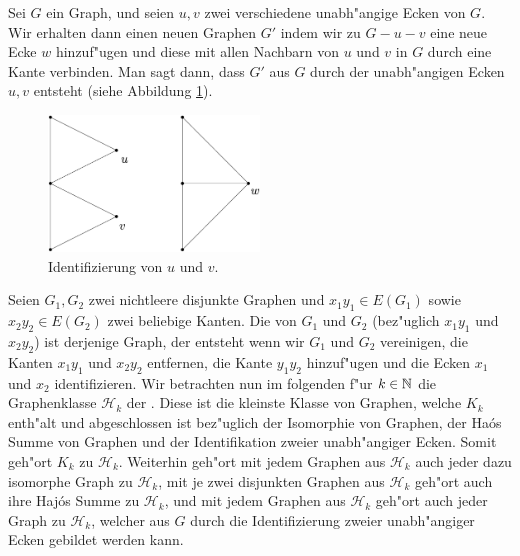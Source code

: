 Sei $G$ ein Graph, und seien $u,v$ zwei verschiedene unabh"angige Ecken von $G$. Wir erhalten dann einen neuen Graphen $G'$ indem wir zu $G-u-v$ eine neue Ecke $w$ hinzuf"ugen und diese mit allen Nachbarn von $u$ und $v$ in $G$ durch eine Kante verbinden.
Man sagt dann, dass $G'$ aus $G$ durch  der unabh"angigen Ecken $u,v$ entsteht (siehe Abbildung \ref{fig:identifizierung}).
\begin{figure}[h]
  \centering
  \includegraphics[width=0.5\textwidth]{images/Identifizierung}
  \caption{Identifizierung von $u$ und $v$.}
  \label{fig:identifizierung}
\end{figure}

Seien $G_1, G_2$ zwei nichtleere disjunkte Graphen und $x_1y_1\in E(G_1)$ sowie $x_2y_2 \in E(G_2)$ zwei beliebige Kanten. Die  von $G_1$ und $G_2$ (bez"uglich $x_1y_1$ und $x_2y_2$) ist derjenige Graph, der entsteht wenn wir $G_1$ und $G_2$ vereinigen, die Kanten $x_1y_1$ und $x_2y_2$ entfernen, die Kante $y_1y_2$ hinzuf"ugen und  die Ecken $x_1$ und $x_2$ identifizieren. 
Wir betrachten nun im folgenden f"ur $k\in {\mathbb{N}}$ die Graphenklasse $\mathcal{H}_k$ der . Diese ist die kleinste Klasse von Graphen, welche $K_k$ enth"alt und abgeschlossen ist bez"uglich der Isomorphie von Graphen, der Ha\'os Summe von Graphen und der Identifikation zweier unabh"angiger Ecken. Somit geh"ort $K_k$ zu $\mathcal{H}_k$. Weiterhin geh"ort mit jedem Graphen aus $\mathcal{H}_k$ auch jeder dazu isomorphe Graph zu $\mathcal{H}_k$,
mit je zwei disjunkten Graphen aus $\mathcal{H}_k$ geh"ort auch ihre Haj\'os Summe zu $\mathcal{H}_k$, und mit jedem Graphen aus $\mathcal{H}_k$ geh"ort auch jeder Graph zu $\mathcal{H}_k$, welcher aus $G$ durch die Identifizierung zweier unabh"angiger Ecken gebildet werden kann. 


